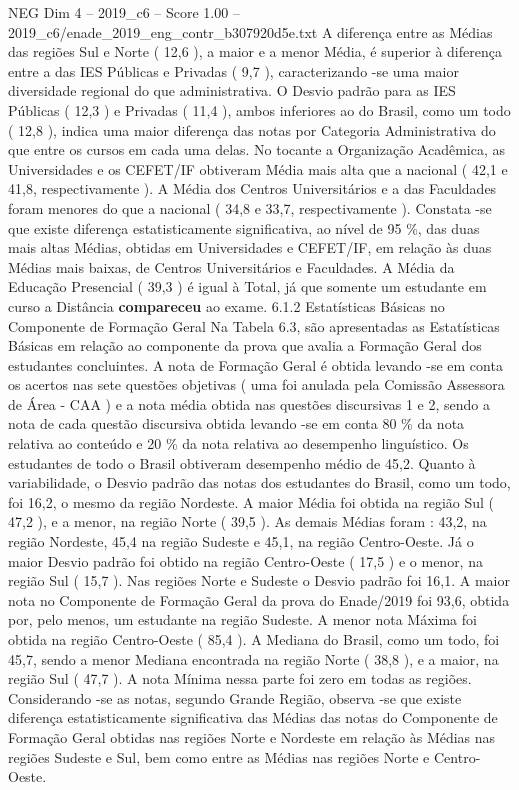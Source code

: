 \begin{textsample}{NEG Dim 4 – 2019\_c6 – Score 1.00 – 2019\_c6/enade\_2019\_eng\_contr\_b307920d5e.txt}
A diferença entre as Médias das regiões Sul e Norte ( 12,6 ), a maior e a menor Média, é superior à diferença entre a das IES Públicas e Privadas ( 9,7 ), caracterizando -se uma maior diversidade regional do que administrativa.
O Desvio padrão para as IES Públicas ( 12,3 ) e Privadas ( 11,4 ), ambos inferiores ao do Brasil, como um todo ( 12,8 ), indica uma maior diferença das notas por Categoria Administrativa do que entre os cursos em cada uma delas.
No tocante a Organização Acadêmica, as Universidades e os CEFET/IF obtiveram Média mais alta que a nacional ( 42,1 e 41,8, respectivamente ).
A Média dos Centros Universitários e a das Faculdades foram menores do que a nacional ( 34,8 e 33,7, respectivamente ).
Constata -se que existe diferença estatisticamente significativa, ao nível de 95 \%, das duas mais altas Médias, obtidas em Universidades e CEFET/IF, em relação às duas Médias mais baixas, de Centros Universitários e Faculdades.
A Média da Educação Presencial ( 39,3 ) é igual à Total, já que somente um estudante em curso a Distância \textbf{compareceu} ao exame. 6.1.2 Estatísticas Básicas no Componente de Formação Geral Na Tabela 6.3, são apresentadas as Estatísticas Básicas em relação ao componente da prova que avalia a Formação Geral dos estudantes concluintes.
A nota de Formação Geral é obtida levando -se em conta os acertos nas sete questões objetivas ( uma foi anulada pela Comissão Assessora de Área - CAA ) e a nota média obtida nas questões discursivas 1 e 2, sendo a nota de cada questão discursiva obtida levando -se em conta 80 \% da nota relativa ao conteúdo e 20 \% da nota relativa ao desempenho linguístico.
Os estudantes de todo o Brasil obtiveram desempenho médio de 45,2.
Quanto à variabilidade, o Desvio padrão das notas dos estudantes do Brasil, como um todo, foi 16,2, o mesmo da região Nordeste.
A maior Média foi obtida na região Sul ( 47,2 ), e a menor, na região Norte ( 39,5 ).
As demais Médias foram : 43,2, na região Nordeste, 45,4 na região Sudeste e 45,1, na região Centro-Oeste.
Já o maior Desvio padrão foi obtido na região Centro-Oeste ( 17,5 ) e o menor, na região Sul ( 15,7 ).
Nas regiões Norte e Sudeste o Desvio padrão foi 16,1.
A maior nota no Componente de Formação Geral da prova do Enade/2019 foi 93,6, obtida por, pelo menos, um estudante na região Sudeste.
A menor nota Máxima foi obtida na região Centro-Oeste ( 85,4 ).
A Mediana do Brasil, como um todo, foi 45,7, sendo a menor Mediana encontrada na região Norte ( 38,8 ), e a maior, na região Sul ( 47,7 ).
A nota Mínima nessa parte foi zero em todas as regiões.
Considerando -se as notas, segundo Grande Região, observa -se que existe diferença estatisticamente significativa das Médias das notas do Componente de Formação Geral obtidas nas regiões Norte e Nordeste em relação às Médias nas regiões Sudeste e Sul, bem como entre as Médias nas regiões Norte e Centro-Oeste.

\end{textsample}

